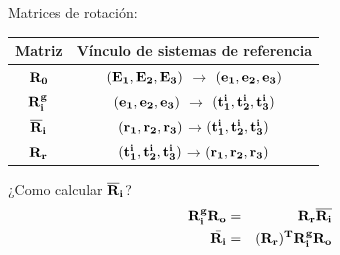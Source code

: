 \documentclass[
  aspectratio=169,
]{beamer}
\begin{document}
\begin{small}
\begin{frame}{Matrices de rotación:}{}
	\begin{minipage}[t]{0.5\linewidth}
		\begin{figure}[htbp]
			\centering
			\def\svgwidth{60mm}
			
		\end{figure}
	\end{minipage}\hfill
	\begin{minipage}[t]{0.5\linewidth}
		\begin{table}[htbp]
			\begin{tabular}{|c|c|}
			\hline
			Matriz & Vínculo de sistemas de referencia \\
			\hline \hline
			$\bf{R}_0$ &$(\bf{E_1},\bf{E_2},\bf{E_3})$ $\rightarrow$
			$(\bf{e_1},\bf{e_2},\bf{e_3})$   \\ \hline
			$\bf{R}_i^g$ & $(\bf{e_1},\bf{e_2},\bf{e_3})$ $\rightarrow$
			$(\bf{t_1^i},\bf{t_2^i},\bf{t_3^i})$ \\ \hline
			$\bf{\overline{R}}_i$ &
			$(\bf{r_1},\bf{r_2},\bf{r_3})$$\rightarrow$$(\bf{t_1^i},\bf{t_2^i},\bf{t_3^i})$
			\\ \hline
			$\bf{R}_r$ &
			$(\bf{t_1^i},\bf{t_2^i},\bf{t_3^i})$$\rightarrow$$(\bf{r_1},\bf{r_2},\bf{r_3})$ \\
			\hline
			\end{tabular}
		\end{table}
		\begin{block}{¿Como calcular $\bf{\overline{R}}_i$? }
	\begin{eqnarray}
		\bf{R_i^g}\bf{R_o}&=& \bf{R_r}\overline{\bf{R_i}}\\
			\bar{\bf{R_i}}&=&(\bf{R_r})^T\bf{R_i^g}\bf{R_o}
	\end{eqnarray}
		\end{block}
	\end{minipage}	
\end{frame}
	

\end{small}
\end{document}
